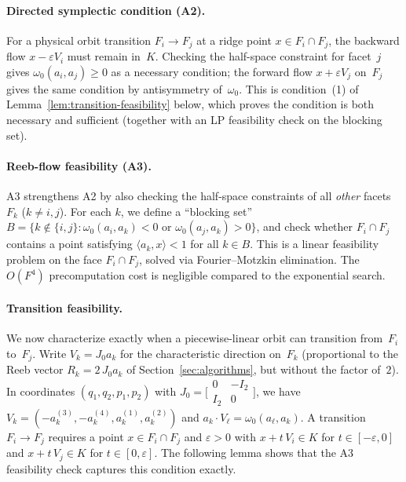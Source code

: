 \paragraph{Directed symplectic condition (A2).}
For a physical orbit transition $F_i \to F_j$ at a ridge point $x \in F_i \cap F_j$,
the backward flow $x - \varepsilon V_i$ must remain in~$K$.
Checking the half-space constraint for facet~$j$ gives
$\omega_0(a_i, a_j) \ge 0$ as a necessary condition;
the forward flow $x + \varepsilon V_j$ on~$F_j$ gives the same condition
by antisymmetry of~$\omega_0$.
This is condition~(1) of Lemma~\ref{lem:transition-feasibility} below,
which proves the condition is both necessary and sufficient
(together with an LP feasibility check on the blocking set).

\paragraph{Reeb-flow feasibility (A3).}
A3 strengthens A2 by also checking the half-space constraints of all \emph{other}
facets $F_k$ ($k \neq i, j$).
For each $k$, we define a ``blocking set''
$B = \{k \notin \{i,j\} : \omega_0(a_i, a_k) < 0 \text{ or } \omega_0(a_j, a_k) > 0\}$,
and check whether $F_i \cap F_j$ contains a point satisfying
$\langle a_k, x \rangle < 1$ for all $k \in B$.
This is a linear feasibility problem on the face $F_i \cap F_j$,
solved via Fourier--Motzkin elimination.
The $O(F^4)$ precomputation cost is negligible compared to the exponential search.

\paragraph{Transition feasibility.}
We now characterize exactly when a piecewise-linear orbit can
transition from~$F_i$ to~$F_j$.
Write $V_k = J_0 a_k$ for the characteristic direction on~$F_k$
(proportional to the Reeb vector $R_k = 2\, J_0 a_k$
of Section~\ref{sec:algorithms}, but without the factor of~$2$).
In coordinates $(q_1, q_2, p_1, p_2)$ with
$J_0 = \bigl[\begin{smallmatrix} 0 & -I_2 \\ I_2 & 0 \end{smallmatrix}\bigr]$,
we have $V_k = (-a_k^{(3)}, -a_k^{(4)}, a_k^{(1)}, a_k^{(2)})$
and $a_k \cdot V_\ell = \omega_0(a_\ell, a_k)$.
A transition $F_i \to F_j$ requires a point $x \in F_i \cap F_j$
and $\varepsilon > 0$ with
$x + t\, V_i \in K$ for $t \in [-\varepsilon, 0]$
and $x + t\, V_j \in K$ for $t \in [0, \varepsilon]$.
The following lemma shows that the A3 feasibility check
captures this condition exactly.

